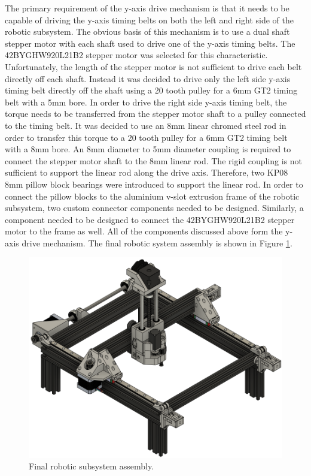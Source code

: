 
The primary requirement of the y-axis drive mechanism is that it needs to be capable of driving the y-axis timing belts on both the left and right side of the robotic subsystem. The obvious basis of this mechanism is to use a dual shaft stepper motor with each shaft used to drive one of the y-axis timing belts. The 42BYGHW920L21B2 stepper motor was selected for this characteristic. Unfortunately, the length of the stepper motor is not sufficient to drive each belt directly off each shaft. Instead it was decided to drive only the left side y-axis timing belt directly off the shaft using a 20 tooth pulley for a 6mm GT2 timing belt with a 5mm bore. In order to drive the right side y-axis timing belt, the torque needs to be transferred from the stepper motor shaft to a pulley connected to the timing belt. It was decided to use an 8mm linear chromed steel rod in order to transfer this torque to a 20 tooth pulley for a 6mm GT2 timing belt with a 8mm bore. An 8mm diameter to 5mm diameter coupling is required to connect the stepper motor shaft to the 8mm linear rod. The rigid coupling is not sufficient to support the linear rod along the drive axis. Therefore, two KP08 8mm pillow block bearings were introduced to support the linear rod. In order to connect the pillow blocks to the aluminium v-slot extrusion frame of the robotic subsystem, two custom connector components needed to be designed. Similarly, a component needed to be designed to connect the 42BYGHW920L21B2 stepper motor to the frame as well. All of the components discussed above form the y-axis drive mechanism. The final robotic system assembly is shown in Figure \ref{fig:final-assembly}.


\begin{figure}[H]
	\centering
	\includegraphics[width=0.7\linewidth]{figures/final-assembly.png}
	\caption{Final robotic subsystem assembly.}
	\label{fig:final-assembly}
\end{figure}

